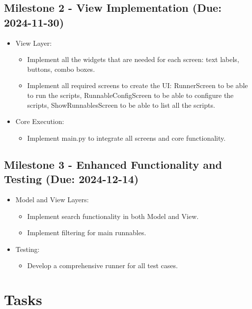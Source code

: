 \documentclass{article}
\begin{document}
\subsection*{Milestone 2 - View Implementation (Due: 2024-11-30)}
\begin{itemize}
    \item View Layer:
        \begin{itemize}
            \item Implement all the widgets that are needed for each screen\@: text labels, buttons, combo boxes.
            \item Implement all required screens to create the UI\@: RunnerScreen to be able to run the scripts, RunnableConfigScreen to be able to configure the scripts, ShowRunnablesScreen to be able to list all the scripts.
        \end{itemize}
    \item Core Execution:
        \begin{itemize}
            \item Implement main.py to integrate all screens and core functionality.
        \end{itemize}
\end{itemize}

\subsection*{Milestone 3 - Enhanced Functionality and Testing (Due: 2024-12-14)}
\begin{itemize}
    \item Model and View Layers:
        \begin{itemize}
            \item Implement search functionality in both Model and View.
            \item Implement filtering for main runnables.
        \end{itemize}
    \item Testing:
        \begin{itemize}
            \item Develop a comprehensive runner for all test cases.
        \end{itemize}
\end{itemize}

\section{Tasks}
\end{document}
